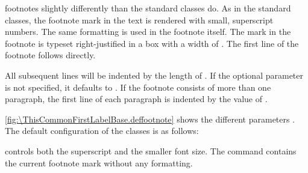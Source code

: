 \begin{Declaration}
\end{Declaration}%
 footnotes slightly
differently than the standard classes do. As in the standard classes, the
footnote mark in the text is rendered with small, superscript numbers. The
same formatting is used in the footnote itself. The mark in the footnote is
typeset right-justified in a box with a width of . The first
line of the footnote follows directly.

All subsequent lines will be indented by the length of . If the
optional parameter  is not specified, it defaults to
. If the footnote consists of more than one paragraph, the first
line of each paragraph is indented by the value of .

\autoref{fig:\ThisCommonFirstLabelBase.deffootnote} %
%
shows the different parameters%
%
. The default configuration of the \KOMAScript{} classes is as follows:
\IfThisCommonLabelBase{scrextend}{\iftrue}{\csname iffalse\endcsname}%
\begin{lstcode}
\end{lstcode}
\else
\begin{lstcode}
  \deffootnote[1em]{1.5em}{1em}{%
    \textsuperscript{\thefootnotemark}%
  }
\end{lstcode}
\fi%
 controls both the
superscript and the smaller font size. The command 
contains the current footnote mark without any formatting.%
%

